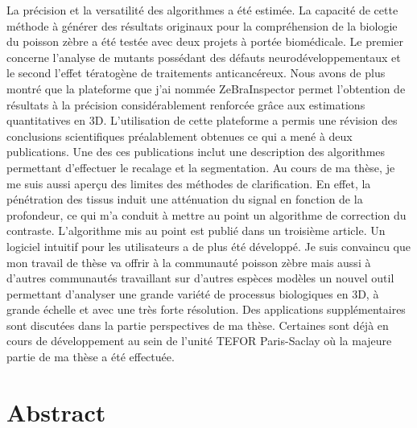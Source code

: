 La précision et la versatilité des algorithmes a été estimée. La capacité de cette méthode à générer des résultats originaux pour la compréhension de la biologie du poisson zèbre a été testée avec deux projets à portée biomédicale. Le premier concerne l'analyse de mutants possédant des défauts neurodéveloppementaux et le second  l'effet tératogène de traitements anticancéreux. Nous avons de plus montré que la plateforme que j'ai nommée ZeBraInspector permet l'obtention de résultats à la précision considérablement renforcée grâce aux estimations quantitatives en 3D. L'utilisation de cette plateforme a permis une révision des conclusions scientifiques préalablement obtenues ce qui a mené à deux publications. Une des ces publications inclut une description des algorithmes permettant d'effectuer le recalage et la segmentation. Au cours de ma thèse, je me suis aussi aperçu des limites des méthodes de clarification. En effet, la pénétration des tissus induit une atténuation du signal en fonction de la profondeur, ce qui m'a conduit à mettre au point un algorithme de correction du contraste. L'algorithme mis au point est publié dans un troisième article. Un logiciel intuitif pour les utilisateurs a de plus été développé. Je suis convaincu que mon travail de thèse va offrir à la communauté poisson zèbre mais aussi à d'autres communautés travaillant sur d'autres espèces modèles un nouvel outil permettant d'analyser une grande variété de processus biologiques en 3D, à grande échelle et avec une très forte résolution. Des applications supplémentaires sont discutées dans la partie perspectives de ma thèse. Certaines sont déjà en cours de développement au sein de l'unité TEFOR Paris-Saclay où la majeure partie de ma thèse a été effectuée.

\newpage

\chapter*{Abstract}

